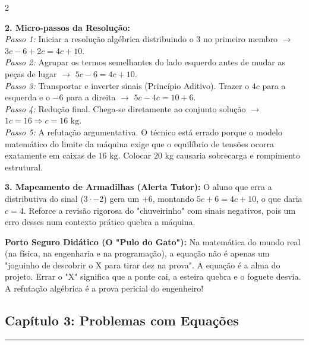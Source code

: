 \begin{multicols*}{2}
\begin{tcolorbox}[colback=CorTitUm!5, colframe=CorTitUm, boxrule=1pt, arc=4pt, left=6pt, right=6pt, top=6pt, bottom=6pt]
    \textbf{2. Micro-passos da Resolução:}\\
    \textit{Passo 1:} Iniciar a resolução algébrica distribuindo o 3 no primeiro membro $\rightarrow$ $3c - 6 + 2c = 4c + 10$.\\
    \textit{Passo 2:} Agrupar os termos semelhantes do lado esquerdo antes de mudar as peças de lugar $\rightarrow$ $5c - 6 = 4c + 10$.\\
    \textit{Passo 3:} Transportar e inverter sinais (Princípio Aditivo). Trazer o $4c$ para a esquerda e o $-6$ para a direita $\rightarrow$ $5c - 4c = 10 + 6$.\\
    \textit{Passo 4:} Redução final. Chega-se diretamente ao conjunto solução $\rightarrow$ $1c = 16 \Rightarrow c = 16 \text{ kg}$.\\
    \textit{Passo 5:} A refutação argumentativa. O técnico está errado porque o modelo matemático do limite da máquina exige que o equilíbrio de tensões ocorra exatamente em caixas de $16 \text{ kg}$. Colocar $20 \text{ kg}$ causaria sobrecarga e rompimento estrutural.\par\vspace{0.1cm}
    
    \textbf{3. Mapeamento de Armadilhas (Alerta Tutor):} O aluno que erra a distributiva do sinal ($3 \cdot -2$) gera um $+6$, montando $5c + 6 = 4c + 10$, o que daria $c = 4$. Reforce a revisão rigorosa do "chuveirinho" com sinais negativos, pois um erro desses num contexto prático quebra a máquina.
    \end{tcolorbox}
    \vspace{0.15cm}
    
    \begin{boxexplicacao}
    \textbf{Porto Seguro Didático (O "Pulo do Gato"):} Na matemática do mundo real (na física, na engenharia e na programação), a equação não é apenas um "joguinho de descobrir o X para tirar dez na prova". A equação é a alma do projeto. Errar o "X" significa que a ponte cai, a esteira quebra e o foguete desvia. A refutação algébrica é a prova pericial do engenheiro!
    \end{boxexplicacao}
\fi

\par\vspace{\espacoQuestao}
\subsection*{Capítulo 3: Problemas com Equações}
\vspace{-0.2cm}\noindent\rule{\linewidth}{1.5pt} 
\par\vspace{\espacoPosTitulo}

\end{multicols*}
